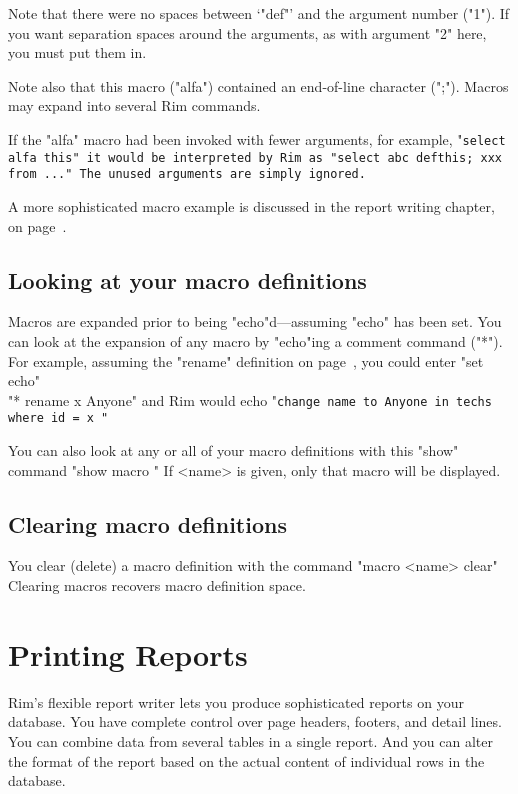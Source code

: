 Note that there were no spaces between `"def"' and the argument number ("1").
If you want separation spaces around the arguments, as with argument
"2" here, you must put them in.
 
Note also that this macro ("alfa") contained an end-of-line character
(";").  Macros may expand into several Rim commands.
 
If the "alfa" macro had been invoked with fewer arguments, for example,
\<"\tt select alfa this"\>
it would be interpreted by Rim as
\<"\tt select abc  defthis; xxx from ..."\>
The unused arguments are simply ignored.
 
A more sophisticated macro example is discussed
in the report writing chapter, on page~\pageref{run-mac}.
 
\section{Looking at your macro definitions}
\label{show-mac}
Macros are expanded prior to being "echo"d---assuming "echo"
has been set.
You can look at the expansion of any macro by "echo"ing a
comment command ("*").  For example, assuming the "rename" 
definition on page~\pageref{rename-def}, you could enter
\<"set echo"\\"* rename x Anyone"\>
and Rim would echo
\<"\tt change name to Anyone in techs where id = x "\>
   

You can also look at any or all of your macro definitions
with this "show" command
\<"show macro "\>
If <name> is given, only that macro will be displayed.
 
\section{Clearing macro definitions}
You clear (delete) a macro definition with the command
\<"macro <name> clear"\>
Clearing macros recovers macro definition space.
 
 
%
%
\def\demobreak{\par\pagebreak[3]\bigskip}
\def\Rimdisp{\setbox\Rimdemobox=\vbox\bgroup\hsize=29pc\scriptsize}
\def\enddisp{\egroup\noindent
  \makebox[\textwidth]{\fbox{\fbox{\box\Rimdemobox}}}}
%
\chapter{Printing Reports}
%
\label{report-writer}
Rim's flexible report writer lets you produce
sophisticated reports on your database.
You have complete control over page headers, footers,
and detail lines.  You can combine data from several tables
in a single report. And you can alter the format of the
report based on the actual content of individual rows
in the database.
 
